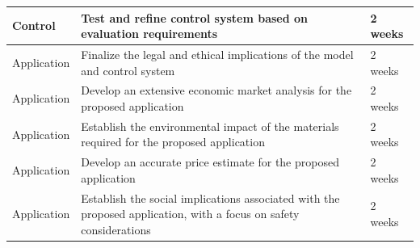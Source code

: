 \begin{center}
\begin{tabular}{|p{2.3cm}|p{10.5cm}|p{2cm}|}
\hline Control &
Test and refine control system based on evaluation requirements & 2 weeks\\
\hline Application &
Finalize the legal and ethical implications of the model and control system & 2 weeks \\
\hline Application &
Develop an extensive economic market analysis for the proposed application & 2 weeks\\
\hline Application & 
Establish the environmental impact of the materials required for the proposed application & 2 weeks\\
\hline Application &
Develop an accurate price estimate for the proposed application & 2 weeks\\
\hline Application & Establish the social implications associated with the proposed application, with a focus on safety considerations & 2 weeks\\
\hline
\end{tabular}
\end{center}
\clearpage